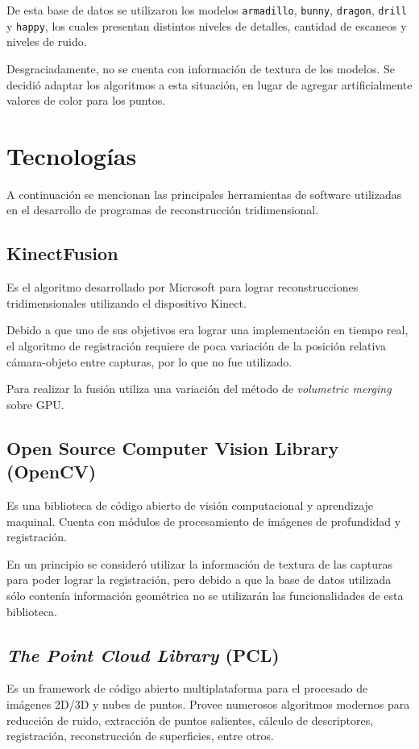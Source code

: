 De esta base de datos se utilizaron los modelos
	\texttt{armadillo},
	\texttt{bunny},
	\texttt{dragon},
	\texttt{drill} y
	\texttt{happy},
los cuales presentan distintos niveles de detalles, cantidad de escaneos y niveles de ruido.




Desgraciadamente, no se cuenta con información de textura de los modelos.
Se decidió adaptar los algoritmos a esta situación, en lugar de agregar
artificialmente valores de color para los puntos.


\section{Tecnologías}
	A continuación se mencionan las principales herramientas de software
	utilizadas en el desarrollo de programas de reconstrucción tridimensional.

	\subsection{KinectFusion}
	Es el algoritmo desarrollado por Microsoft para lograr reconstrucciones
	tridimensionales utilizando el dispositivo Kinect.

	Debido a que uno de sus objetivos era lograr una implementación en tiempo
	real, el algoritmo de registración requiere de poca variación
	de la posición relativa cámara-objeto entre capturas, por lo que no fue utilizado.

	Para realizar la fusión utiliza una variación del método de
	\emph{volumetric merging} sobre GPU.\cite{Izadi:2011:KRR:2047196.2047270}

	\subsection{Open Source Computer Vision Library (OpenCV)}
	Es una biblioteca de código abierto de visión computacional y aprendizaje
	maquinal.  Cuenta con módulos de procesamiento de imágenes de profundidad y
	registración.

	En un principio se consideró utilizar la información de textura de las
	capturas para poder lograr la registración, pero debido a que la base de
	datos utilizada sólo contenía información geométrica  no se utilizarán las
	funcionalidades de esta biblioteca.

	\subsection{\emph{The Point Cloud Library} (PCL)}
	Es un framework de código abierto multiplataforma para el procesado de
	imágenes 2D/3D y nubes de puntos.
	Provee numerosos algoritmos modernos para reducción de ruido, extracción de
	puntos salientes, cálculo de descriptores, registración, reconstrucción de
	superficies, entre otros.

